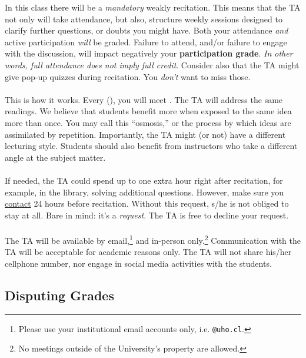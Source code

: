 \documentclass[letterpaper]{article}
\begin{document}
In this class there will be a \emph{mandatory} weakly recitation. This means that the TA not only will take attendance, but also, structure weekly sessions designed  to clarify further questions, or doubts you might have. Both your attendance \emph{and} active participation \emph{will} be graded. Failure to attend, and/or failure to engage with the discussion, will impact negatively your {\bf participation grade}. \emph{In other words, full attendance does not imply full credit}. Consider also that the TA might give pop-up quizzes during recitation. You \emph{don't} want to miss those. 
\\
\\
This is how it works. Every {\unskip} ({\unskip}), you will meet {\unskip}. The TA will address the same readings. We believe that students benefit more when exposed to the same idea more than once. You may call this ``osmosis,'' or the process by which ideas are assimilated by repetition. Importantly, the TA might (or not) have a different lecturing style. Students should also benefit from instructors who take a different angle at the subject matter. 
\\
\\
If needed, the TA could spend up to one extra hour right after recitation, for example, in the library, solving additional questions. However, make sure you \href{mailto:ghbarria@uc.cl}{contact} {\unskip} 24 hours before recitation. Without this request, s/he is not obliged to stay at all. Bare in mind: it's a \emph{request}. The TA is free to decline your request.
\\
\\
The TA will be available by email,\footnote{Please use your institutional email accounts only, i.e. \texttt{@uho.cl}.} and in-person only.\footnote{No meetings outside of the University's property are allowed.} Communication with the TA will be acceptable for academic reasons only. The TA will not share his/her cellphone number, nor engage in social media activities with the students.

\subsection*{Disputing Grades}
\end{document}
